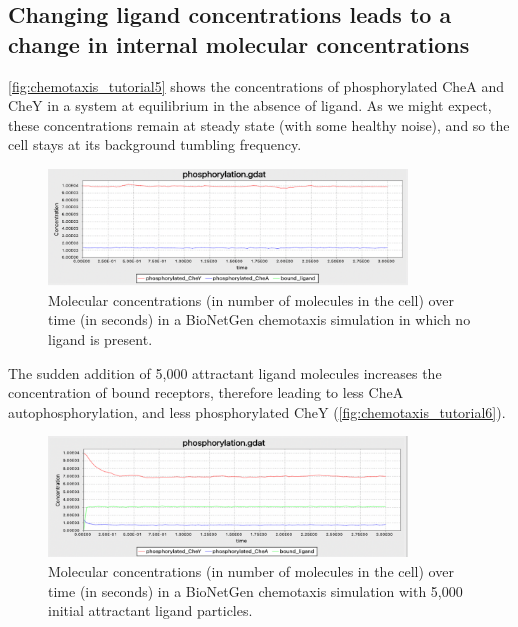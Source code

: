 \FloatBarrier
{}
\subsection{Changing ligand concentrations leads to a change in internal molecular concentrations}

\autoref{fig:chemotaxis_tutorial5} shows the concentrations of phosphorylated CheA and CheY in a system at equilibrium in the absence of ligand. As we might expect, these concentrations remain at steady state (with some healthy noise), and so the cell stays at its background tumbling frequency.

\begin{figure}[h]
\centering
\mySfFamily
\includegraphics[width = 0.85\textwidth]{../images/chemotaxis_tutorial5.png}
\caption{Molecular concentrations (in number of molecules in the cell) over time (in seconds) in a BioNetGen chemotaxis simulation in which no ligand is present.}
\label{fig:chemotaxis_tutorial5}
\end{figure}

The sudden addition of 5,000 attractant ligand molecules increases the concentration of bound receptors, therefore leading to less CheA autophosphorylation, and less phosphorylated CheY (\autoref{fig:chemotaxis_tutorial6}).\\

\begin{figure}[h]
\centering
\mySfFamily
\includegraphics[width = 0.85\textwidth]{../images/chemotaxis_tutorial6.png}
\caption{Molecular concentrations (in number of molecules in the cell) over time (in seconds) in a BioNetGen chemotaxis simulation with 5,000 initial attractant ligand particles.}
\label{fig:chemotaxis_tutorial6}
\end{figure}

